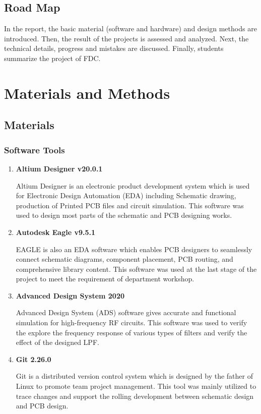 \documentclass[12pt, a4paper]{report}
\begin{document}
\section{Road Map}

In the report, the basic material (software and hardware) and design methods are introduced. Then, the result of the projects is assessed and analyzed. Next, the technical details, progress and mistakes are discussed. Finally, students summarize the project of FDC.




\chapter{Materials and Methods}


\section{Materials}

\subsection{Software Tools}


\begin{enumerate}

\item \textbf{Altium Designer v20.0.1} 

Altium Designer is an electronic product development system which is used for Electronic Design Automation (EDA) including Schematic drawing, production of Printed PCB files and circuit simulation. This software was used to design most parts of the schematic and PCB designing works.

\item \textbf{Autodesk Eagle v9.5.1}

EAGLE is also an EDA software which enables PCB designers to seamlessly connect schematic diagrams, component placement, PCB routing, and comprehensive library content. This software was used at the last stage of the project to meet the requirement of department workshop.

\item \textbf{Advanced Design System 2020}

Advanced Design System (ADS) software gives accurate and functional simulation for high-frequency RF circuits. This software was used to verify the explore the frequency response of various types of filters and verify the effect of the designed LPF.

\item \textbf{Git 2.26.0}

Git is a distributed version control system which is designed by the father of Linux to promote team project management. This tool was mainly utilized to trace changes and support the rolling development between schematic design and PCB design.

\end{enumerate}
\end{document}
